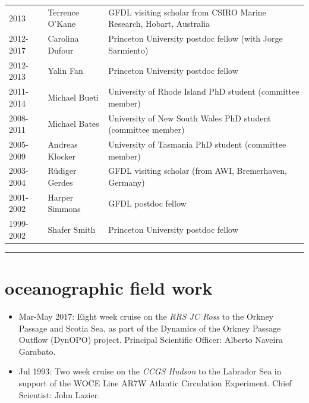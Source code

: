 \documentclass{article}
\begin{document}
\begin{tabular}{lll}
2013               & Terrence O'Kane   & GFDL visiting scholar from CSIRO Marine Research, Hobart, Australia \\

2012-2017     & Carolina Dufour   & Princeton University postdoc fellow (with Jorge Sarmiento)  \\

2012-2013     & Yalin Fan              & Princeton University postdoc fellow  \\

2011-2014     & Michael Bueti       & University of Rhode Island  PhD student (committee member) \\

2008-2011     & Michael Bates       & University of New South Wales PhD student (committee member) \\

2005-2009     & Andreas Klocker   & University of Tasmania  PhD student (committee member) \\

2003-2004     & {R\"{u}diger} Gerdes  & GFDL visiting scholar (from AWI, Bremerhaven, Germany) \\

2001-2002     & Harper Simmons   & GFDL postdoc fellow \\

1999-2002     & Shafer Smith         & Princeton University postdoc fellow    
\end{tabular}


\noindent\rule{\textwidth}{1pt}
\vspace{-1cm}
\section*{\sc \color{Maroon}  oceanographic field work}
\vspace{-.25cm}

\begin{itemize}[leftmargin=*]
 \item 
 Mar-May 2017: Eight week cruise on the {\it RRS JC Ross}  to the Orkney Passage and Scotia Sea,
  as part of the
  Dynamics of the Orkney Passage Outflow (DynOPO) project. Principal Scientific Officer: Alberto Naveira Garabato. 
 \item 
  Jul 1993: Two week cruise on the {\it CCGS Hudson} to the Labrador Sea in support of  the WOCE Line AR7W Atlantic Circulation Experiment. Chief Scientist: John Lazier.
\end{itemize}
\end{document}
